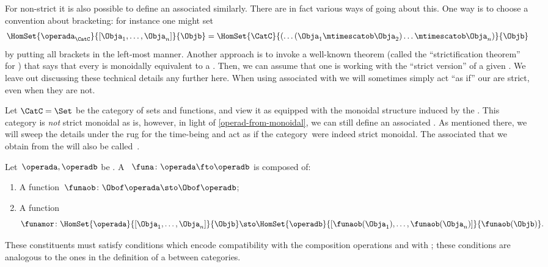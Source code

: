 \begin{remark}
    \label{operad-from-monoidal}
    For non-strict  it is also possible to define an associated  similarly.
    There are in fact various ways of going about this.
    One way is to choose a convention about bracketing: for instance one might set
    \begin{equation}
        \HomSet{\operada_\CatC}{[\Obja_1,\ldots,\Obja_n]}{\Objb}=\HomSet{\CatC}{ ( \dots (\Obja_1 \mtimescatob \Obja_2) \ldots \mtimescatob \Obja_n)}{\Objb}
    \end{equation}
    by putting all brackets in the left-most manner.
    Another approach is to invoke a well-known theorem (called the ``strictification theorem'' for ) that says that every  is monoidally equivalent to a .
    Then, we can assume that one is working with the ``strict version'' of a given .
    We leave out discussing these technical details any further here.
    When using  associated with  we will sometimes simply act ``as if'' our  are strict, even when they are not.
\end{remark}

\begin{example}
    Let $\CatC = \Set$ be the category of sets and functions, and view it as equipped with the monoidal structure induced by the .
    This category is \emph{not} strict monoidal as is, however, in light of \cref{operad-from-monoidal}, we can still define an associated .
    As mentioned there, we will sweep the details under the rug for the time-being and act as if the category~\Set were indeed strict monoidal.
    The associated  that we obtain from the  \Set will also be called~\Set.
\end{example}

\begin{ctdefinition}
    \label{def:functors-operads}
    Let~$\operada,\operadb$ be .
    A ~$\funa\colon \operada \fto \operadb$  is composed of:
    \begin{enumerate}
        \item A function~$\funaob\colon \Obof\operada\sto \Obof\operadb$;
        \item A function
              \begin{equation}
                  \funamor\colon \HomSet{\operada}{[\Obja_1,\ldots,\Obja_n]}{\Objb}\sto \HomSet{\operadb}{[\funaob(\Obja_1),\ldots, \funaob(\Obja_n)]}{\funaob(\Objb)}.
              \end{equation}
    \end{enumerate}
    These constituents must satisfy conditions which encode compatibility with the composition operations and with ; these conditions are analogous to the ones in the definition of a  between categories.
\end{ctdefinition}

